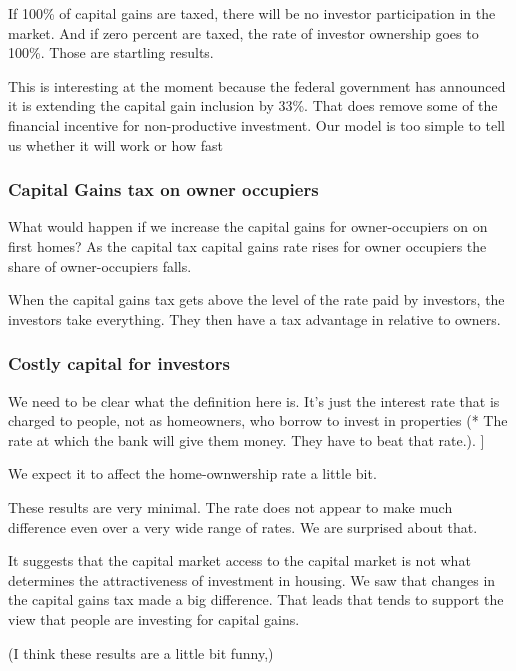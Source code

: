 \documentclass[]{article}
\begin{document}
If 100\% of capital gains are taxed, there will be no investor participation in the market. And if zero percent are taxed, the rate of investor ownership goes to 100\%. Those are startling results.

This is  interesting at the moment because the federal government has announced it is extending  the capital gain inclusion by 33\%. That  does remove some of the financial incentive for non-productive investment. Our model is too simple to tell us whether it will work or how fast

\subsubsection{Capital Gains tax on owner occupiers}

What would happen if we increase the capital gains for owner-occupiers on on first homes? As the capital tax capital gains rate rises for owner occupiers the share of owner-occupiers falls.

When the capital gains tax gets above the level of the rate paid by investors, the investors take everything. They then have a tax advantage in relative to owners.


\subsubsection{Costly capital for investors}

We need to be clear what the definition here is. It’s just the interest rate that is charged to people, not as homeowners, who borrow to invest in properties (* The rate at which the bank will give them money. They have to beat that rate.). ]

We expect it to affect the home-ownwership rate a little bit.

These results are very minimal. The rate does not appear to make much difference even over a very wide range of rates. We are surprised about that.

It suggests that the capital market access to the capital market is not what determines the attractiveness of investment in housing. We saw that changes in the capital gains tax made a big difference. That leads that tends to support the view that people are investing for capital gains.

(I think these results are a little bit funny,)
\end{document}
